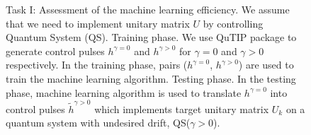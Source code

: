 \documentclass[aps,pra,showkeys,showpacs,notitlepage,superscriptaddress]{revtex4-1}
\newcommand{\1}{{\rm 1\hspace{-0.9mm}l}}
\newcommand{\qutip}{QuTIP\xspace}
\newcommand{\NCP}{\ensuremath{h^{\gamma=0}}\xspace}
\newcommand{\DCP}{\ensuremath{h^{\gamma >0}}\xspace}
\newcommand{\nnDCP}{\ensuremath{\tilde{h}^{\gamma >0}}\xspace}
\begin{document}
\begin{figure}[h!]
{\label{fig:test_scheme}
    }
    \caption{Task I: Assessment of the machine learning efficiency.
        We assume that we need to implement unitary matrix $U$ by controlling Quantum System (QS).
         Training phase. We use \qutip package to generate control pulses \NCP and \DCP for $\gamma=0$ and $\gamma>0$
        respectively. In the training phase, pairs (\NCP, \DCP) are used to train the machine learning
        algorithm.  Testing phase. In the testing phase, machine learning algorithm is used to translate \NCP into 
        control pulses \nnDCP which implements target unitary matrix $U_k$ on a quantum system with undesired
        drift, QS($\gamma>0$).}
    \label{fig:ML_experiment_scheme}
\end{figure}
\end{document}
